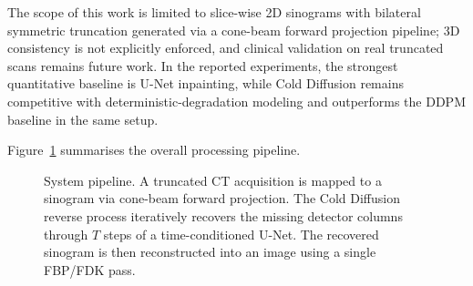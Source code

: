 The scope of this work is limited to slice-wise 2D sinograms with bilateral symmetric truncation generated via a cone-beam forward projection pipeline; 3D consistency is not explicitly enforced, and clinical validation on real truncated scans remains future work. In the reported experiments, the strongest quantitative baseline is U-Net inpainting, while Cold Diffusion remains competitive with deterministic-degradation modeling and outperforms the DDPM baseline in the same setup.

Figure~\ref{fig:intro_pipeline_overview} summarises the overall processing pipeline.

\begin{figure}[htbp]
\centering
{}
\caption{System pipeline. A truncated CT acquisition is mapped to a sinogram via cone-beam forward projection. The Cold Diffusion reverse process iteratively recovers the missing detector columns through $T$ steps of a time-conditioned U-Net. The recovered sinogram is then reconstructed into an image using a single FBP/FDK pass.}
\label{fig:intro_pipeline_overview}
\end{figure}


